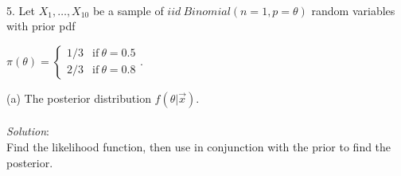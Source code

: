 \documentclass[12pt]{article}
\newcommand{\XB}{\color{black}}
\newcommand{\XBB}{\color{blue}}
\begin{document}
\vspace{2.5mm}

\newpage
\XBB\hrulefill\XB \\

5. Let $ X_{1}, \dots , X_{10} $ be a sample of $ iid \ Binomial(n = 1, p = \theta) $ random variables
with prior pdf \\
\begin{center}
    $\pi(\theta) =
    \begin{cases}
        1/3 & \text{if} \ \theta = 0.5 \\
        2/3 & \text{if} \ \theta = 0.8
    \end{cases} $. \\
\end{center}



\XBB\hrulefill\XB
\vspace{5mm}

(a) The posterior distribution $ f(\theta | \overrightarrow{x}) $. \\
\vspace{2.5mm} \\
\textit{Solution}:
\vspace{2.5mm} \\

\noindent
Find the likelihood function, then use in conjunction with the prior to find the posterior. \\
\end{document}
